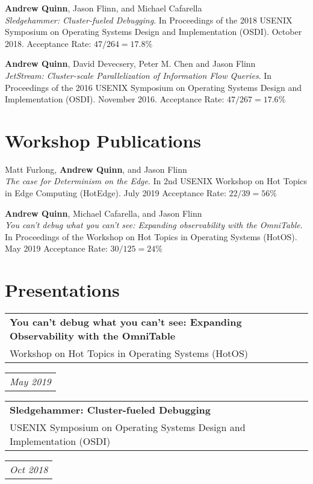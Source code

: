 \documentclass[letterpaper,10pt]{article}
\newcommand{\reitem}[2]{
  \begin{tabular}{l}
    #2
  \end{tabular}
\hfill
\begin{tabular}{r}
  #1
\end{tabular}
}
\newcommand{\quadItem}[4]{\reitem{\emph{#1}\\#2}{\textbf{#3}\\#4}}
\newcommand{\paper}[3]{#1\\#2 #3}
\begin{document}
\paper{\textbf{Andrew Quinn}, Jason Flinn, and Michael Cafarella}{
  \emph{Sledgehammer: Cluster-fueled Debugging}.  In Proceedings of
  the 2018 USENIX Symposium on Operating Systems Design and
  Implementation (OSDI).  October 2018.}{Acceptance Rate: $47/264 = 17.8\%$}

\paper{\textbf{Andrew Quinn}, David Devecsery, Peter M. Chen and Jason
  Flinn}{\emph{JetStream: Cluster-scale Parallelization of Information
  Flow Queries}.  In Proceedings of the 2016 USENIX Symposium on
    Operating Systems Design and Implementation (OSDI). November
  2016.}{Acceptance Rate: $47/267=17.6\%$}
\section{Workshop Publications}
\paper{Matt Furlong, \textbf{Andrew Quinn}, and Jason Flinn}
      {\emph{The case for Determinism on the Edge}.  In 2nd USENIX
        Workshop on Hot Topics in Edge Computing (HotEdge).  July
        2019}{Acceptance Rate: $22/39=56\%$}

\paper{\textbf{Andrew Quinn}, Michael Cafarella, and Jason
  Flinn}{\emph{You can't debug what you can't see: Expanding
    observability with the OmniTable}. In Proceedings of the Workshop
  on Hot Topics in Operating Systems (HotOS).  May 2019}{Acceptance
  Rate: $30/125=24\%$}

\section{Presentations}
\quadItem{May 2019}{}{You can't debug what you can't see: Expanding
  Observability with the OmniTable}{Workshop on Hot Topics in
  Operating Systems (HotOS)}

\quadItem{Oct 2018}{}{Sledgehammer: Cluster-fueled Debugging}{USENIX Symposium
  on Operating Systems Design and Implementation (OSDI)}
\end{document}
